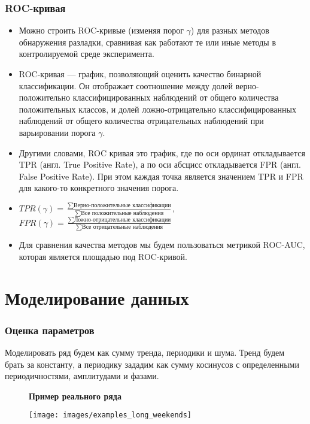 \documentclass[intlimits, 9pt, unicode]{beamer}
\begin{document}
\begin{frame}
    \frametitle{ROC-кривая}

\begin{itemize}
	\item Можно строить ROC-кривые (изменяя порог $\gamma$) для разных методов обнаружения разладки, сравнивая как работают те или иные методы в контролируемой среде эксперимента. 
	\item ROC-кривая --- график, позволяющий оценить качество бинарной классификации. Он отображает соотношение между долей верно-положительно классифицированных наблюдений от общего количества положительных классов, и долей ложно-отрицательно классифицированных наблюдений от общего количества отрицательных наблюдений при варьировании порога $\gamma$.
	\item Другими словами, ROC кривая это график, где по оси ординат откладывается TPR (англ. True Positive Rate), а по оси абсцисс откладывается FPR (англ. False Positive Rate). При этом каждая точка является значением TPR и FPR для какого-то конкретного значения порога.
	\item $TPR (\gamma) = \frac{\sum\text{Верно-положительные классификации}}{\sum \text{Все положительные наблюдения}}$, $FPR(\gamma) = \frac{\sum\text{Ложно-отрицательные классификации}}{\sum \text{Все отрицательные наблюдения}}$
	\item Для сравнения качества методов мы будем пользоваться метрикой ROC-AUC, которая является площадью под ROC-кривой. 
\end{itemize}

\end{frame}

\section{Моделирование данных}

\begin{frame}
\frametitle{Оценка параметров}

Моделировать ряд будем как сумму тренда, периодики и шума. Тренд будем брать за константу, а периодику зададим как сумму косинусов с определенными периодичностями, амплитудами и фазами.

\begin{figure}
\textbf{Пример реального ряда}\par\medskip
\texttt{[image: images/examples\_long\_weekends]}
\end{figure}
\end{frame}
\end{document}
